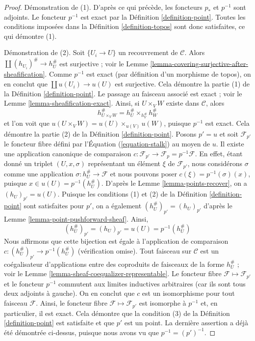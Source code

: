 \begin{proof}
Démonstration de (1). D’après ce qui précède, les foncteurs $p_*$ et $p^{-1}$
sont adjoints. Le foncteur $p^{-1}$ est exact par la
Définition \ref{definition-point}.
Toutes les conditions imposées dans la Définition \ref{definition-topos} sont
donc satisfaites, ce qui démontre (1).

\medskip\noindent
Démonstration de (2). Soit $\{U_i \to U\}$ un recouvrement de $\mathcal{C}$.
Alors $\coprod (h_{U_i})^\# \to h_U^\#$ est surjective ; voir le
Lemme \ref{lemma-covering-surjective-after-sheafification}.
Comme $p^{-1}$ est exact (par définition d’un morphisme de topos), on en
conclut que $\coprod u(U_i) \to u(U)$ est surjective.
Cela démontre la partie (1) de la Définition \ref{definition-point}.
Le passage au faisceau associé est exact ; voir le
Lemme \ref{lemma-sheafification-exact}.
Ainsi, si $U \times_V W$ existe dans $\mathcal{C}$, alors
$$
h_{U \times_V W}^\# =  h_U^\# \times_{h_V^\#} h_W^\#
$$
et l’on voit que $u(U \times_V W) = u(U) \times_{u(V)} u(W)$, puisque
$p^{-1}$ est exact. Cela démontre la partie (2) de la
Définition \ref{definition-point}.
Posons $p' = u$ et soit $\mathcal{F}_{p'}$ le foncteur fibre défini par
l’Équation (\ref{equation-stalk}) au moyen de $u$. Il existe une application
canonique de comparaison
$c : \mathcal{F}_{p'} \to \mathcal{F}_p = p^{-1}\mathcal{F}$.
En effet, étant donné un triplet $(U, x, \sigma)$ représentant un élément
$\xi$ de $\mathcal{F}_{p'}$, nous considérons $\sigma$ comme une application
$\sigma : h_U^\# \to \mathcal{F}$ et nous pouvons poser
$c(\xi) = p^{-1}(\sigma)(x)$, puisque
$x \in u(U) = p^{-1}(h_U^\#)$. D’après le
Lemme \ref{lemma-points-recover}, on a $(h_U)_{p'} = u(U)$. Puisque les
conditions (1) et (2) de la Définition \ref{definition-point} sont satisfaites
pour $p'$, on a également $(h_U^\#)_{p'} = (h_U)_{p'}$ d’après le
Lemme \ref{lemma-point-pushforward-sheaf}. Ainsi,
$$
(h_U^\#)_{p'} = (h_U)_{p'} = u(U) = p^{-1}(h_U^\#)
$$
Nous affirmons que cette bijection est égale à l’application de comparaison
$c : (h_U^\#)_{p'} \to p^{-1}(h_U^\#)$ (vérification omise).
Tout faisceau sur $\mathcal{C}$ est un coégalisateur d’applications entre des
coproduits de faisceaux de la forme $h_U^\#$ ; voir le
Lemme \ref{lemma-sheaf-coequalizer-representable}.
Le foncteur fibre $\mathcal{F} \mapsto \mathcal{F}_{p'}$ et le foncteur
$p^{-1}$ commutent aux limites inductives arbitraires (car ils sont tous deux
adjoints à gauche).
On en conclut que $c$ est un isomorphisme pour tout faisceau $\mathcal{F}$.
Ainsi, le foncteur fibre $\mathcal{F} \mapsto \mathcal{F}_{p'}$ est isomorphe
à $p^{-1}$ et, en particulier, il est exact. Cela démontre que la condition
(3) de la Définition \ref{definition-point} est satisfaite et que $p'$ est un
point. La dernière assertion a déjà été démontrée ci-dessus, puisque nous
avons vu que $p^{-1} = (p')^{-1}$.
\end{proof}

